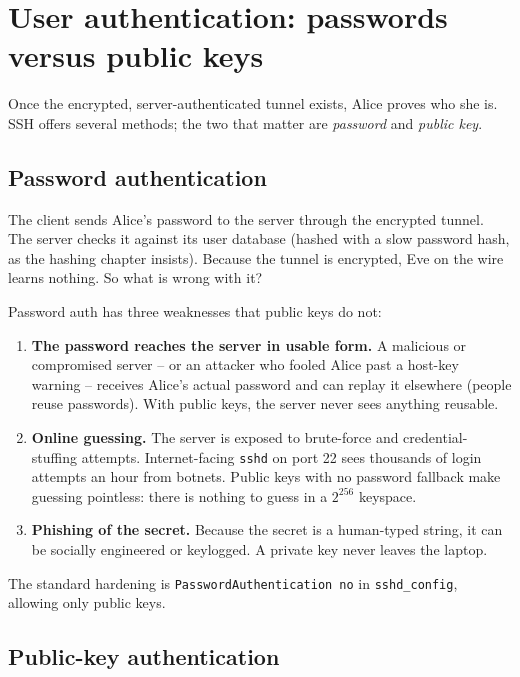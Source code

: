 \section{User authentication: passwords versus public keys}

Once the encrypted, server-authenticated tunnel exists, Alice proves who she is. SSH offers several methods; the two that matter are \emph{password} and \emph{public key}.

\subsection{Password authentication}

The client sends Alice's password to the server through the encrypted tunnel. The server checks it against its user database (hashed with a slow password hash, as the hashing chapter insists). Because the tunnel is encrypted, Eve on the wire learns nothing. So what is wrong with it?

\begin{trapbox}
Password auth has three weaknesses that public keys do not:
\begin{enumerate}
  \item \textbf{The password reaches the server in usable form.} A malicious or compromised server -- or an attacker who fooled Alice past a host-key warning -- receives Alice's actual password and can replay it elsewhere (people reuse passwords). With public keys, the server never sees anything reusable.
  \item \textbf{Online guessing.} The server is exposed to brute-force and credential-stuffing attempts. Internet-facing \texttt{sshd} on port 22 sees thousands of login attempts an hour from botnets. Public keys with no password fallback make guessing pointless: there is nothing to guess in a $2^{256}$ keyspace.
  \item \textbf{Phishing of the secret.} Because the secret is a human-typed string, it can be socially engineered or keylogged. A private key never leaves the laptop.
\end{enumerate}
The standard hardening is \texttt{PasswordAuthentication no} in \texttt{sshd\_config}, allowing only public keys.
\end{trapbox}

\subsection{Public-key authentication}

